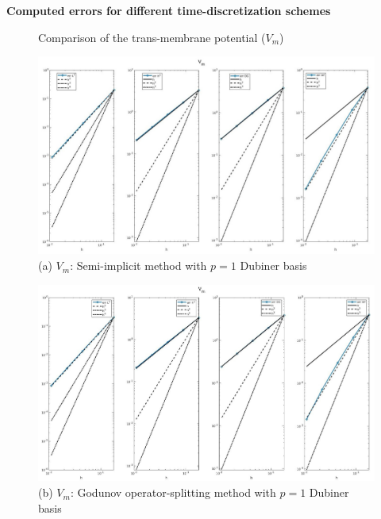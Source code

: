 \documentclass[a4paper,11pt]{article}
\begin{document}
\begin{center}
\textbf{Computed errors for different time-discretization schemes}
\end{center}
\begin{figure}[h]
\caption{Comparison of the trans-membrane potential ($V_m$)}
\label{Vm-time}
\begin{center}
\includegraphics[width = \textwidth]{./D1_Vm_1.jpg}
\caption*{(a) $V_m$: Semi-implicit method with $p=1$ Dubiner basis}
\end{center}
\end{figure}
\begin{figure}[H]
\begin{center}
\includegraphics[width =\textwidth]{./D1_Vm_1_GO.jpg}
\caption*{(b) $V_m$: Godunov operator-splitting method with $p=1$ Dubiner basis}
\end{center}
\end{figure}
\newpage
\end{document}
